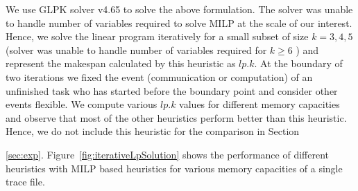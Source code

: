 \documentclass[sigconf]{acmart}
\begin{document}
We use GLPK solver v4.65 to solve the above formulation. The solver was unable to handle number of variables required to solve MILP at the scale of our interest. Hence, we solve the linear program iteratively for a small subset of size $k=3,4,5$ (solver was unable to handle number of variables required for $k\ge6$ ) and represent the makespan calculated by this heuristic as $lp.k$. At the boundary of two iterations we fixed the event (communication or computation) of an unfinished task who has  started before the boundary point and consider other events flexible. We compute various  $lp.k$ values for different memory capacities and observe that most of the other heuristics perform better than this heuristic. Hence, we do not include  this heuristic for the comparison in Section~{\ref{sec:exp}. Figure~\ref{fig:iterativeLpSolution} shows the performance of different heuristics with MILP based heuristics for various memory capacities of a single trace file.
\begin{figure}[htb]

\end{figure}}
\end{document}
